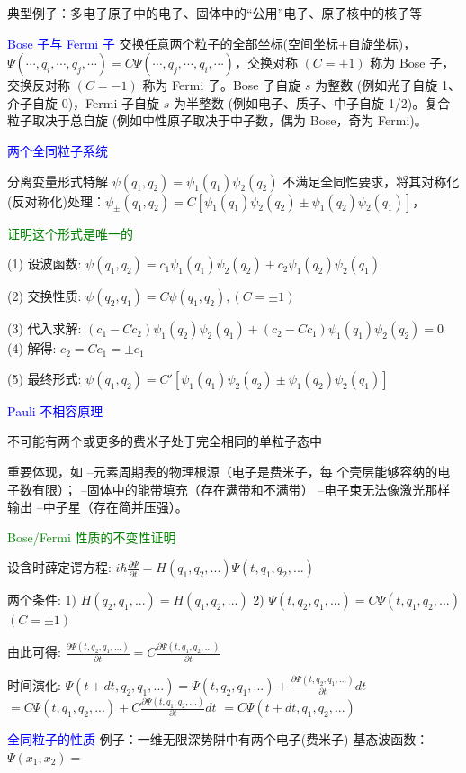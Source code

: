 \documentclass[a4paper,8pt]{extarticle} %
\newcommand{\bluetext}[1]{\textcolor{blue}{#1}}
\newcommand{\greentext}[1]{\textcolor{green}{#1}}
\begin{document}
\begin{multicols}{3}
典型例子：多电子原子中的电子、固体中的“公用”电子、原子核中的核子等

\bluetext{Bose 子与 Fermi 子}
交换任意两个粒子的全部坐标(空间坐标+自旋坐标)，$\Psi(\cdots,q_i,\cdots,q_j,\cdots)=C\Psi(\cdots,q_j,\cdots,q_i,\cdots)$，交换对称 $(C=+1)$ 称为 Bose 子，交换反对称 $(C=-1)$ 称为 Fermi 子。Bose 子自旋 $s$ 为整数 (例如光子自旋 1、介子自旋 0)，Fermi 子自旋 $s$ 为半整数 (例如电子、质子、中子自旋 1/2)。复合粒子取决于总自旋 (例如中性原子取决于中子数，偶为 Bose，奇为 Fermi)。

\bluetext{两个全同粒子系统}

分离变量形式特解 $\psi(q_1,q_2) = \psi_1(q_1)\psi_2(q_2)$ 不满足全同性要求，将其对称化(反对称化)处理：$\psi_{\pm}(q_1,q_2) = C[\psi_1(q_1)\psi_2(q_2) \pm \psi_1(q_2)\psi_2(q_1)]$，

\greentext{证明这个形式是唯一的}

(1) 设波函数:
$\psi(q_1,q_2) = c_1\psi_1(q_1)\psi_2(q_2) + c_2\psi_1(q_2)\psi_2(q_1)$

(2) 交换性质:
$\psi(q_2,q_1) = C\psi(q_1,q_2), (C = \pm1)$

(3) 代入求解:
$(c_1 - Cc_2)\psi_1(q_2)\psi_2(q_1) + (c_2 - Cc_1)\psi_1(q_1)\psi_2(q_2) = 0$
(4) 解得:
$c_2 = Cc_1 = \pm c_1$

(5) 最终形式:
$\psi(q_1,q_2) = C'[\psi_1(q_1)\psi_2(q_2) \pm \psi_1(q_2)\psi_2(q_1)]$

\bluetext{Pauli 不相容原理}

不可能有两个或更多的费米子处于完全相同的单粒子态中

重要体现，如
–元素周期表的物理根源（电子是费米子，每
个壳层能够容纳的电子数有限）；
–固体中的能带填充（存在满带和不满带）
–电子束无法像激光那样输出
–中子星（存在简并压强）。

\greentext{Bose/Fermi 性质的不变性证明}

设含时薛定谔方程:
$i\hbar\frac{\partial\Psi}{\partial t} = H(q_1,q_2,...)\Psi(t,q_1,q_2,...)$

两个条件:
1) $H(q_2,q_1,...) = H(q_1,q_2,...)$
2) $\Psi(t,q_2,q_1,...) = C\Psi(t,q_1,q_2,...)$ $(C = \pm1)$

由此可得:
$\frac{\partial\Psi(t,q_2,q_1,...)}{\partial t} = C\frac{\partial\Psi(t,q_1,q_2,...)}{\partial t}$

时间演化:
$\Psi(t+dt,q_2,q_1,...) = \Psi(t,q_2,q_1,...) + \frac{\partial\Psi(t,q_2,q_1,...)}{\partial t}dt$
$= C\Psi(t,q_1,q_2,...) + C\frac{\partial\Psi(t,q_1,q_2,...)}{\partial t}dt$
$= C\Psi(t+dt,q_1,q_2,...)$

\bluetext{全同粒子的性质}
例子：一维无限深势阱中有两个电子(费米子)
基态波函数：
$\Psi(x_1,x_2)= $


\end{multicols}
\end{document}
